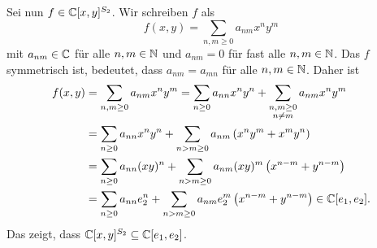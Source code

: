 \documentclass[a4paper,10pt]{article}
\begin{document}
Sei nun $f \in \mathbb{C}[x,y]^{S_2}$. Wir schreiben $f$ als
\[
 f(x,y) = \sum_{n,m \geq 0} a_{nm} x^n y^m
\]
mit $a_{nm} \in \mathbb{C}$ für alle $n,m \in \mathbb{N}$ und $a_{nm} = 0$ für fast alle $n,m \in \mathbb{N}$. Das $f$ symmetrisch ist, bedeutet, dass $a_{nm} = a_{mn}$ für alle $n,m \in \mathbb{N}$. Daher ist
\begin{align*}
 f(x,y)
 &= \sum_{n,m \geq 0} a_{nm} x^n y^m
 = \sum_{n \geq 0} a_{nn} x^n y^n + \sum_{\substack{n,m \geq 0 \\ n \neq m}} a_{nm} x^n y^m \\
 &= \sum_{n \geq 0} a_{nn} x^n y^n + \sum_{n > m \geq 0} a_{nm}\left(x^n y^m + x^m y^n\right) \\
 &= \sum_{n \geq 0} a_{nn} (xy)^n + \sum_{n > m \geq 0} a_{nm} (xy)^m \left(x^{n-m} + y^{n-m}\right) \\
 &= \sum_{n \geq 0} a_{nn} e_2^n + \sum_{n > m \geq 0} a_{nm} e_2^m \left(x^{n-m} + y^{n-m}\right)
 \in \mathbb{C}[e_1, e_2].
\end{align*}
Das zeigt, dass $\mathbb{C}[x,y]^{S_2} \subseteq \mathbb{C}[e_1, e_2]$.
\end{document}
